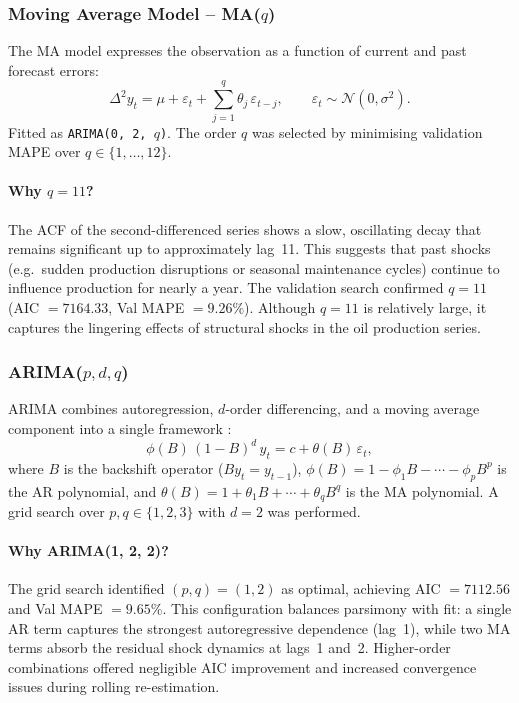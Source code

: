 \documentclass[12pt,a4paper]{article}
\begin{document}
\subsubsection{Moving Average Model -- MA($q$)}

The MA model expresses the observation as a function of current and past forecast errors:
\begin{equation}
  \Delta^2 y_t = \mu + \varepsilon_t + \sum_{j=1}^{q}\theta_j\,\varepsilon_{t-j}, \qquad \varepsilon_t \sim \mathcal{N}(0,\sigma^2).
  \label{eq:ma}
\end{equation}
Fitted as \texttt{ARIMA(0, 2, $q$)}. The order $q$ was selected by minimising validation MAPE over $q \in \{1, \ldots, 12\}$.

\paragraph{Why $q = 11$?}
The ACF of the second-differenced series shows a slow, oscillating decay that remains significant up to approximately lag~11. This suggests that past shocks (e.g.\ sudden production disruptions or seasonal maintenance cycles) continue to influence production for nearly a year. The validation search confirmed $q = 11$ (AIC $= 7164.33$, Val MAPE $= 9.26\%$). Although $q = 11$ is relatively large, it captures the lingering effects of structural shocks in the oil production series.

\subsubsection{ARIMA($p,d,q$)}

ARIMA combines autoregression, $d$-order differencing, and a moving average component into a single framework \citep{box2015}:
\begin{equation}
  \phi(B)\,(1-B)^d\,y_t = c + \theta(B)\,\varepsilon_t,
  \label{eq:arima}
\end{equation}
where $B$ is the backshift operator ($B y_t = y_{t-1}$), $\phi(B) = 1 - \phi_1 B - \cdots - \phi_p B^p$ is the AR polynomial, and $\theta(B) = 1 + \theta_1 B + \cdots + \theta_q B^q$ is the MA polynomial. A grid search over $p, q \in \{1, 2, 3\}$ with $d = 2$ was performed.

\paragraph{Why ARIMA(1, 2, 2)?}
The grid search identified $(p,q) = (1,2)$ as optimal, achieving AIC $= 7112.56$ and Val MAPE $= 9.65\%$. This configuration balances parsimony with fit: a single AR term captures the strongest autoregressive dependence (lag~1), while two MA terms absorb the residual shock dynamics at lags~1 and~2. Higher-order combinations offered negligible AIC improvement and increased convergence issues during rolling re-estimation.
\end{document}
